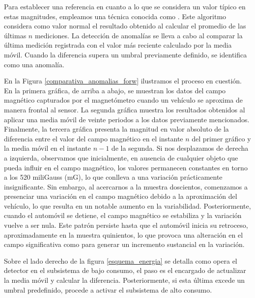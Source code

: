 Para establecer una referencia en cuanto a lo que se considera un valor típico en estas magnitudes, empleamos una técnica conocida como . Este algoritmo considera como valor normal el resultado obtenido al calcular el promedio de las últimas $n$ mediciones. La detección de anomalías se lleva a cabo al comparar la última medición registrada con el valor más reciente calculado por la media móvil. Cuando la diferencia supera un umbral previamente definido, se identifica como una anomalía.

En la Figura \ref{comparativa_anomalias_forw} ilustramos el proceso en cuestión. En la primera gráfica, de arriba a abajo, se muestran los datos del campo magnético capturados por el magnetómetro cuando un vehículo se aproxima de manera frontal al sensor. La segunda gráfica muestra los resultados obtenidos al aplicar una media móvil de veinte periodos a los datos previamente mencionados. Finalmente, la tercera gráfica presenta la magnitud en valor absoluto de la diferencia entre el valor del campo magnético en el instante $n$ del primer gráfico y la media móvil en el instante $n-1$ de la segunda.
Si nos desplazamos de derecha a izquierda, observamos que inicialmente, en ausencia de cualquier objeto que pueda influir en el campo magnético, los valores permanecen constantes en torno a los 520 miliGauss (mG), lo que conlleva a una variación prácticamente insignificante. Sin embargo, al acercarnos a la muestra doscientos, comenzamos a presenciar una variación en el campo magnético debido a la aproximación del vehículo, lo que resulta en un notable aumento en la variabilidad. Posteriormente, cuando el automóvil se detiene, el campo magnético se estabiliza y la variación vuelve a ser nula. Este patrón persiste hasta que el automóvil inicia su retroceso, aproximadamente en la muestra quinientos, lo que provoca una alteración en el campo significativa como para generar un incremento sustancial en la variación.


Sobre el lado derecho de la figura \ref{esquema_energia} se detalla como opera el detector en el subsistema de bajo consumo, el paso  es el encargado de actualizar la media móvil y calcular la diferencia. Posteriormente, si esta última excede un umbral predefinido, procede a activar el subsistema de alto consumo.


